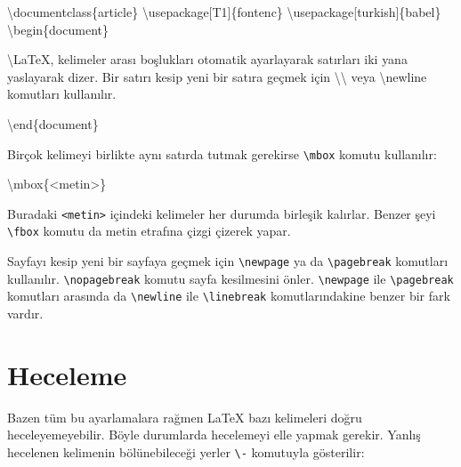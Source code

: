 \documentclass[
  letterpaper,
  DIV=11,
  numbers=noendperiod]{scrreprt}
\newenvironment{Shaded}{\begin{snugshade}}{\end{snugshade}}
\newcommand{\BuiltInTok}[1]{\textcolor[rgb]{0.00,0.23,0.31}{#1}}
\newcommand{\ExtensionTok}[1]{\textcolor[rgb]{0.00,0.23,0.31}{#1}}
\newcommand{\FunctionTok}[1]{\textcolor[rgb]{0.28,0.35,0.67}{#1}}
\newcommand{\KeywordTok}[1]{\textcolor[rgb]{0.00,0.23,0.31}{#1}}
\newcommand{\NormalTok}[1]{\textcolor[rgb]{0.00,0.23,0.31}{#1}}
\begin{document}
\begin{Shaded}
\begin{Highlighting}[]
\BuiltInTok{\textbackslash{}documentclass}\NormalTok{\{}\ExtensionTok{article}\NormalTok{\}}
\BuiltInTok{\textbackslash{}usepackage}\NormalTok{[T1]\{}\ExtensionTok{fontenc}\NormalTok{\}}
\BuiltInTok{\textbackslash{}usepackage}\NormalTok{[turkish]\{}\ExtensionTok{babel}\NormalTok{\}}
\KeywordTok{\textbackslash{}begin}\NormalTok{\{}\ExtensionTok{document}\NormalTok{\}}

\FunctionTok{\textbackslash{}LaTeX}\NormalTok{, kelimeler arası boşlukları otomatik ayarlayarak satırları iki}
\NormalTok{yana yaslayarak dizer. Bir satırı kesip yeni bir satıra geçmek için }\FunctionTok{\textbackslash{}\textbackslash{}}
\NormalTok{veya }\FunctionTok{\textbackslash{}newline}\NormalTok{ komutları kullanılır.}

\KeywordTok{\textbackslash{}end}\NormalTok{\{}\ExtensionTok{document}\NormalTok{\}}
\end{Highlighting}
\end{Shaded}

Birçok kelimeyi birlikte aynı satırda tutmak gerekirse
\texttt{\textbackslash{}mbox} komutu kullanılır:

\begin{Shaded}
\begin{Highlighting}[]
\FunctionTok{\textbackslash{}mbox}\NormalTok{\{\textless{}metin\textgreater{}\}}
\end{Highlighting}
\end{Shaded}

Buradaki \texttt{\textless{}metin\textgreater{}} içindeki kelimeler her
durumda birleşik kalırlar. Benzer şeyi \texttt{\textbackslash{}fbox}
komutu da metin etrafına çizgi çizerek yapar.

Sayfayı kesip yeni bir sayfaya geçmek için
\texttt{\textbackslash{}newpage} ya da
\texttt{\textbackslash{}pagebreak} komutları kullanılır.
\texttt{\textbackslash{}nopagebreak} komutu sayfa kesilmesini önler.
\texttt{\textbackslash{}newpage} ile \texttt{\textbackslash{}pagebreak}
komutları arasında da \texttt{\textbackslash{}newline} ile
\texttt{\textbackslash{}linebreak} komutlarındakine benzer bir fark
vardır.

\hypertarget{heceleme}{%
\section{Heceleme}\label{heceleme}}

Bazen tüm bu ayarlamalara rağmen {\LaTeX} bazı kelimeleri doğru
heceleyemeyebilir. Böyle durumlarda hecelemeyi elle yapmak gerekir.
Yanlış hecelenen kelimenin bölünebileceği yerler
\texttt{\textbackslash{}-} komutuyla gösterilir:
\end{document}
